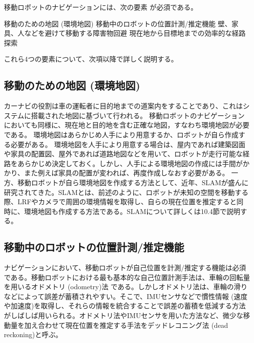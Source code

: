 移動ロボットのナビゲーションには、次の要素  が必須である。

\setcounter{num}{0}

\circled{\thenum} 移動のための地図   (環境地図)
\circled{\thenum} 移動中のロボットの位置計測/推定機能
\circled{\thenum} 壁、家具、人などを避けて移動する障害物回避
\circled{\thenum} 現在地から目標地までの効率的な経路探索

これら4つの要素について、次項以降で詳しく説明する。

\subsection{移動のための地図 (環境地図)}

カーナビの役割は車の運転者に目的地までの道案内をすることであり、これはシステムに搭載された地図に基づいて行われる。 移動ロボットのナビゲーションにおいても同様に、現在地と目的地を含む正確な地図，すなわち環境地図が必要である。  環境地図はあらかじめ人手により用意するか、ロボットが自ら作成する必要がある。
環境地図を人手により用意する場合は、屋内であれば建築図面や家具の配置図、屋外であれば道路地図などを用いて、ロボットが走行可能な経路をあらかじめ決定しておく。しかし、人手による環境地図の作成には手間がかかり、また例えば家具の配置が変われば、再度作成しなおす必要がある。
一方、移動ロボットが自ら環境地図を作成する方法として、近年、SLAMが盛んに研究されてきた。SLAMとは、前述のように、ロボットが未知の空間を移動する際、LRFやカメラで周囲の環境情報を取得し、自らの現在位置を推定すると同時に、環境地図も作成する方法である。SLAMについて詳しくは10.4節で説明する。

\subsection{移動中のロボットの位置計測/推定機能}

ナビゲーションにおいて、移動ロボットが自己位置を計測/推定する機能は必須である。移動ロボットにおける最も基本的な自己位置計測手法は、車輪の回転量を用いるオドメトリ (odometry)法  である。しかしオドメトリ法は、車輪の滑りなどによって誤差が蓄積されやすい。そこで、IMUセンサなどで慣性情報 (速度や加速度)を取得し、それらの情報を統合することで誤差の蓄積を低減する方法がしばしば用いられる。オドメトリ法やIMUセンサを用いた方法など、微少な移動量を加え合わせて現在位置を推定する手法をデッドレコニング法 (dead reckoning)と呼ぶ。

